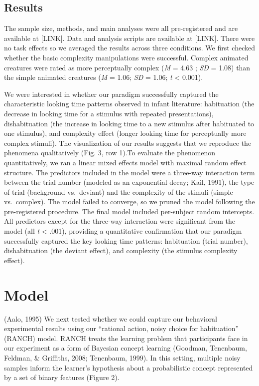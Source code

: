 \documentclass[10pt, letterpaper]{article}
\begin{document}
\hypertarget{results}{%
\subsection{Results}\label{results}}

The sample size, methods, and main analyses were all pre-registered and
are available at {[}LINK{]}. Data and analysis scripts are available at
{[}LINK{]}. There were no task effects so we averaged the results across
three conditions. We first checked whether the basic complexity
manipulations were successful. Complex animated creatures were rated as
more perceptually complex (\emph{M} = 4.63 ; \emph{SD} = 1.08) than the
simple animated creatures (\emph{M} = 1.06; \emph{SD} = 1.06; \emph{t}
\textless{} 0.001).

We were interested in whether our paradigm successfully captured the
characteristic looking time patterns observed in infant literature:
habituation (the decrease in looking time for a stimulus with repeated
presentations), dishabituation (the increase in looking time to a new
stimulus after habituated to one stimulus), and complexity effect
(longer looking time for perceptually more complex stimuli). The
visualization of our results suggests that we reproduce the phenomena
qualitatively (Fig. 3, row 1).To evaluate the phenomenon quantitatively,
we ran a linear mixed effects model with maximal random effect
structure. The predictors included in the model were a three-way
interaction term between the trial number (modeled as an exponential
decay; Kail, 1991), the type of trial (background vs.~deviant) and the
complexity of the stimuli (simple vs.~complex). The model failed to
converge, so we pruned the model following the pre-registered procedure.
The final model included per-subject random intercepts. All predictors
except for the three-way interaction were significant from the model
(all \emph{t} \textless{} .001), providing a quantitative confirmation
that our paradigm successfully captured the key looking time patterns:
habituation (trial number), dishabituation (the deviant effect), and
complexity (the stimulus complexity effect).

\hypertarget{model}{%
\section{Model}\label{model}}

(Aalo, 1995) We next tested whether we could capture our behavioral
experimental results using our ``rational action, noisy choice for
habituation'' (RANCH) model. RANCH treats the learning problem that
participants face in our experiment as a form of Bayesian concept
learning (Goodman, Tenenbaum, Feldman, \& Griffiths, 2008; Tenenbaum,
1999). In this setting, multiple noisy samples inform the learner's
hypothesis about a probabilistic concept represented by a set of binary
features (Figure 2).
\end{document}
